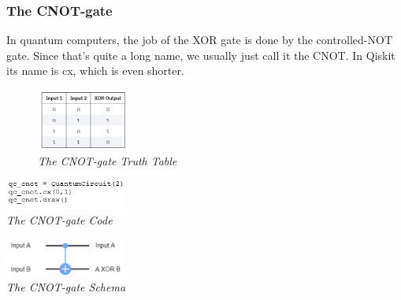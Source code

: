 \documentclass{article}
\begin{document}
\subsubsection{The CNOT-gate } 
In quantum computers, the job of the XOR gate is done by the controlled-NOT gate. Since that's quite a long name, we usually just call it the CNOT. In Qiskit its name is cx, which is even shorter.
\begin{figure}[h]
\begin{center}
\begin{minipage}[b]{3cm}
\centering
\includegraphics[width=3cm]{cnot_truthtable.png}\\\textit{The CNOT-gate Truth Table}
\end{minipage}
\end{center}
\end{figure}
\newpage
\begin{mdframed}
\begin{center}
\begin{minipage}[b]{4cm}
\centering
\includegraphics[width=4cm]{cnot_code.png}\\\textit{The CNOT-gate Code}
\end{minipage}
\begin{minipage}[b]{4cm}
\centering
\includegraphics[width=4cm]{cnot_schema.png}\\\textit{The CNOT-gate Schema}
\end{minipage}
\end{center}
\end{mdframed}
\end{document}
